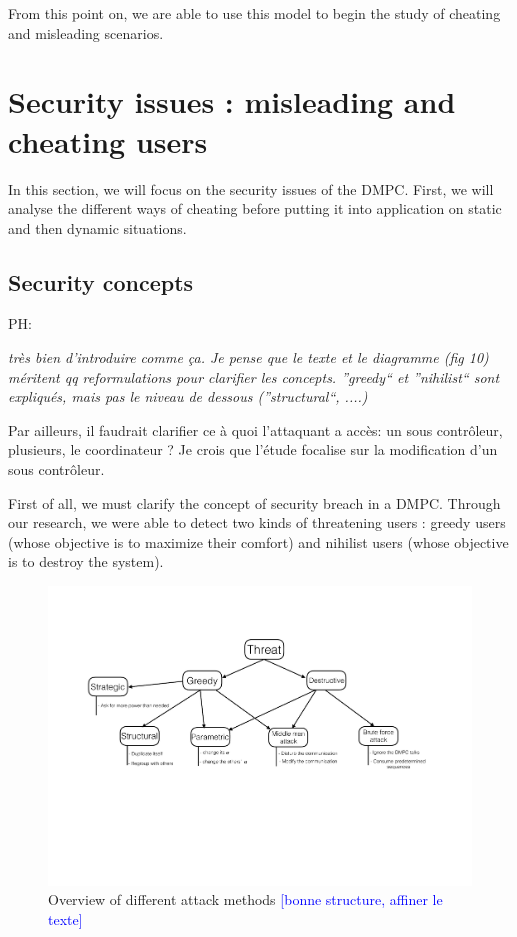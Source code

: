 \documentclass[conference]{IEEEtran}
\newcommand{\rem}[1]{\textcolor{blue}{[#1]}}
\begin{document}
From this point on, we are able to use this model to begin the study of cheating and misleading scenarios.
  
\section{Security issues : misleading and cheating users}
In this section, we will focus on the security issues of the DMPC. First, we will analyse the different ways of cheating before putting it into application on static and then dynamic situations. 

\subsection{Security concepts}

PH: {\itshape très bien d'introduire comme ça. Je pense que le texte et le diagramme (fig 10) méritent qq reformulations pour clarifier les concepts. ''greedy`` et ''nihilist`` sont expliqués, mais pas le niveau de dessous (''structural``, ....)

Par ailleurs, il faudrait clarifier ce à quoi l'attaquant a accès: un sous contrôleur, plusieurs, le coordinateur ?
Je crois que l'étude focalise sur la modification d'un sous contrôleur.
}

First of all, we must clarify the concept of security breach in a DMPC. Through our research, we were able to detect two kinds of threatening users : greedy users (whose objective is to maximize their comfort) and nihilist users (whose objective is to destroy the system). 

 \begin{figure}[!t]
\centering
\includegraphics[width=5.5in]{mindmap}
\caption{Overview of different attack methods
\rem{bonne structure, affiner le texte}
}
\label{mindmap}
\end{figure}
\end{document}
